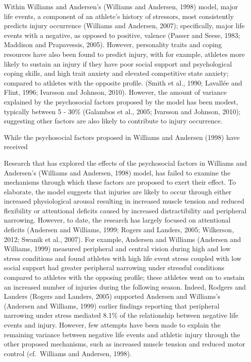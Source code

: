 \documentclass[utf8]{frontiersHLTH}
\begin{document}
Within Williams and Andersen's (Williams and Andersen, 1998) model,
major life events, a component of an athlete's history of stressors,
most consistently predicts injury occurrence (Williams and Andersen,
2007); specifically, major life events with a negative, as opposed to
positive, valence (Passer and Seese, 1983; Maddison and Prapavessis,
2005). However, personality traits and coping resources have also been
found to predict injury, with for example, athletes more likely to
sustain an injury if they have poor social support and psychological
coping skills, and high trait anxiety and elevated competitive state
anxiety; compared to athletes with the opposite profile. (Smith et al.,
1990; Lavallée and Flint, 1996; Ivarsson and Johnson, 2010). However,
the amount of variance explained by the psychosocial factors proposed by
the model has been modest, typically between 5 - 30\% (Galambos et al.,
2005; Ivarsson and Johnson, 2010); suggesting other factors are also
likely to contribute to injury occurrence.

While the psychosocial factors proposed in Williams and Andersen (1998)
have received

Research that has explored the effects of the psychosocial factors in
Williams and Andersen's (Williams and Andersen, 1998) model, has failed
to examine the mechanisms through which these factors are proposed to
exert their effect. To elaborate, the model suggests that injuries are
likely to occur through either increased physiological arousal resulting
in increased muscle tension and reduced flexibility or attentional
deficits caused by increased distractibility and peripheral narrowing.
However, to date, the research has largely focused on attentional
deficits (Andersen and Williams, 1999; Rogers and Landers, 2005;
Wilkerson, 2012; Swanik et al., 2007). For example, Andersen and
Williams (Andersen and Williams, 1999) measured peripheral and central
vision during high and low stress conditions and found athletes with
high life event stress coupled with low social support had greater
peripheral narrowing under stressful conditions compared to athletes
with the opposing profile; these athletes went on to sustain an
increased number of injuries during the following season. Indeed,
Rodgers and Landers (Rogers and Landers, 2005) supported Andersen and
Williams's (Andersen and Williams, 1999) earlier findings reporting that
peripheral narrowing under stress mediated 8.1\% of the relationship
between negative life events and injury. However, few attempts have been
made to explain the remaining variance between negative life events and
athletic injury through the other proposed mechanisms, such as increased
muscle tension and reduced motor control (cf.~Williams and Andersen,
1998).
\end{document}
